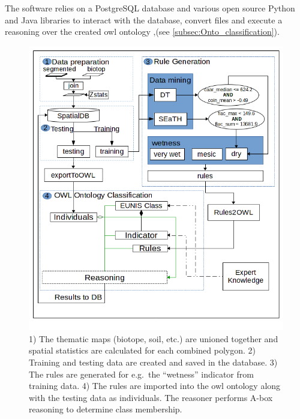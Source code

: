 \documentclass[authoryear,review,12pt,number]{elsarticle}
\begin{document}
The software relies on a PostgreSQL database and various open source Python and 
Java libraries to interact with the database, convert files and execute a 
reasoning over the created \gls{owl} ontology ‚(see 
\ref{subsec:Onto_classification}). 
\begin{figure}
\includegraphics[width=1\linewidth]{diagrams/final_workflow_diagram.png}
\caption
    {
        1) The thematic maps (biotope, soil, etc.) are unioned together and
        spatial statistics are calculated for each combined polygon.
        2) Training and testing data are created and saved in the database.
        3) The rules are generated for e.g.\ the ``wetness'' indicator from
        training data.
        4) The rules are imported into the \gls{owl} ontology along with the 
testing
        data as individuals. The reasoner performs A-box reasoning to determine
        class membership.
    \label{fig:full_workflow}}
\end{figure}
\end{document}
